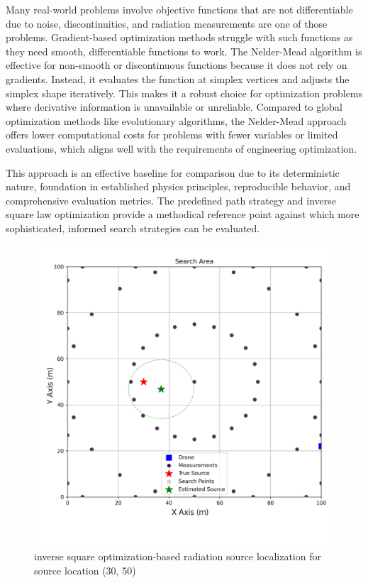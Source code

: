 \documentclass[../report.tex]{subfiles}
\begin{document}
        
    Many real-world problems involve objective functions that are not differentiable due to noise, discontinuities, and radiation measurements are one of those 
    problems. Gradient-based optimization methods struggle with such functions as they need smooth, differentiable functions to work. The Nelder-Mead algorithm is 
    effective for non-smooth or discontinuous functions because it does not rely on gradients. Instead, it evaluates the function at simplex vertices and adjusts the 
    simplex shape iteratively. This makes it a robust choice for optimization problems where derivative information is unavailable or unreliable. Compared to global optimization methods 
    like evolutionary algorithms, the Nelder-Mead approach offers lower computational costs for problems with fewer variables or limited evaluations, which aligns 
    well with the requirements of engineering optimization. \cite{luersen2004constrained}


    This approach is an effective baseline for comparison due to its deterministic nature, foundation in established physics principles, reproducible 
    behavior, and comprehensive evaluation metrics. The predefined path strategy and inverse square law optimization provide a methodical reference
    point against which more sophisticated, informed search strategies can be evaluated.
    
    \begin{figure}[ht]
        \centering
        \includegraphics[width=\linewidth]{figures/inverse_square_method_with_label.png}
        \caption{inverse square optimization-based radiation source localization for source location (30, 50)}
        \label{fig:inverse_square_method_plot}
    \end{figure}
\end{document}
